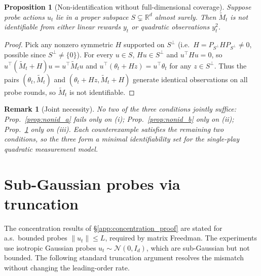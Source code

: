 \documentclass{article}
\newcommand{\R}{\mathbb{R}}
\newtheorem{proposition}{Proposition}
\newtheorem{remark}{Remark}
\begin{document}
\begin{proposition}[Non-identification without full-dimensional coverage]
\label{prop:nonid_c}
Suppose probe actions $u_t$ lie in a proper subspace $S\subsetneq\R^d$
almost surely. Then $\widetilde M_t$ is not identifiable from either
linear rewards $y_t$ or quadratic observations $y_t^2$.
\end{proposition}
\begin{proof}
Pick any nonzero symmetric $H$ supported on $S^\perp$ (i.e.\
$H = P_{S^\perp} H P_{S^\perp}\ne 0$, possible since
$S^\perp\ne\{0\}$). For every $u\in S$, $Hu\in S^\perp$ and $u^\top H u=0$,
so $u^\top(\widetilde M_t + H)u = u^\top\widetilde M_t u$ and
$u^\top(\theta_t + Hz)=u^\top\theta_t$ for any $z\in S^\perp$. Thus the
pairs $(\theta_t,\widetilde M_t)$ and $(\theta_t+Hz,\widetilde M_t+H)$
generate identical observations on all probe rounds, so $\widetilde M_t$
is not identifiable.
\end{proof}

\begin{remark}[Joint necessity]
\label{rem:joint_necessity_conf}
No two of the three conditions jointly suffice:
Prop.~\ref{prop:nonid_a} fails only on (i);
Prop.~\ref{prop:nonid_b} only on (ii);
Prop.~\ref{prop:nonid_c} only on (iii). Each counterexample
satisfies the remaining two conditions, so the three form a minimal
identifiability set for the single-play quadratic measurement model.
\end{remark}

\section{Sub-Gaussian probes via truncation}
\label{app:truncation}

The concentration results of \S\ref{app:concentration_proof} are
stated for a.s.\ bounded probes $\|u_t\|\le L$, required by matrix
Freedman. The experiments use isotropic Gaussian probes
$u_t\sim\mathcal N(0,I_d)$, which are sub-Gaussian but not bounded.
The following standard truncation argument resolves the mismatch
without changing the leading-order rate.
\end{document}
